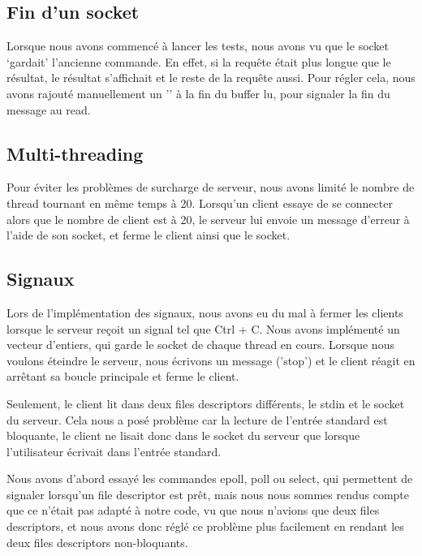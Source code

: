 \documentclass[utf8]{article}
\begin{document}
\begin{large}
\subsection{Fin d'un socket}
\par
\indent

Lorsque nous avons commencé à lancer les tests, nous avons vu que le socket
`gardait' l'ancienne commande. En effet, si la requête était plus longue que le
résultat, le résultat s'affichait et le reste de la requête aussi. Pour régler
cela, nous avons rajouté manuellement un '' à la fin du buffer lu, pour
signaler la fin du message au read.   

\par
\subsection{Multi-threading}

\par 
\indent

Pour éviter les problèmes de surcharge de serveur, nous avons limité le nombre
de thread tournant en même temps à 20. Lorsqu'un client essaye de se connecter
alors que le nombre de client est à 20, le serveur lui envoie un message
d'erreur à l'aide de son socket, et ferme le client ainsi que le socket.

\par
\subsection{Signaux}
\par
\indent

Lors de l'implémentation des signaux, nous avons eu du mal à fermer les clients
lorsque le serveur reçoit un signal tel que Ctrl + C. Nous avons implémenté
un vecteur d'entiers, qui garde le socket de chaque thread en cours. Lorsque nous
voulons éteindre le serveur, nous écrivons un message ('stop') et le client
réagit en arrêtant sa boucle principale et ferme le client.

Seulement, le client lit dans deux files descriptors différents, le
stdin et le socket du serveur. Cela nous a posé problème car la
lecture de l'entrée standard est bloquante, le client ne lisait donc dans le socket du
serveur que lorsque l'utilisateur écrivait dans l'entrée standard. 
\par
\par
Nous avons d'abord essayé les commandes epoll, poll ou select, qui permettent de
signaler lorsqu'un file descriptor est prêt, mais nous nous sommes rendus compte
que ce n'était pas adapté à notre code, vu que nous n'avions que deux files
descriptors, et nous avons donc réglé ce problème plus facilement en rendant les
deux files descriptors non-bloquants.
\par

\end{large}
\end{document}
